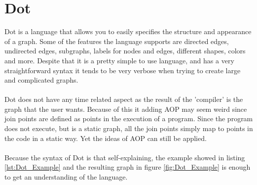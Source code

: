 \documentclass[a4paper]{report}
\begin{document}
\chapter{Dot}
\label{chap:Dot}
Dot is a language that allows you to easily specifies the structure and appearance of a graph. Some of the features the language supports  are directed edges, undirected edges, subgraphs, labels for nodes and edges, different shapes, colors and more. Despite that it is a pretty simple to use language, and has a very straightforward syntax it tends to be very verbose when trying to create large and complicated graphs.\\
\\
Dot does not have any time related aspect as the result of the 'compiler' is the graph that the user wants. Because of this it adding AOP may seem weird since join points are defined as points in the execution of a program. Since the program does not execute, but is a static graph, all the join points simply map to points in the code in a static way. Yet the ideas of AOP can still be applied.\\
\\
Because the syntax of Dot is that self-explaining, the example showed in listing \ref{lst:Dot_Example} and the resulting graph in figure \ref{fig:Dot_Example} is enough to get an understanding of the language.\\
\end{document}
